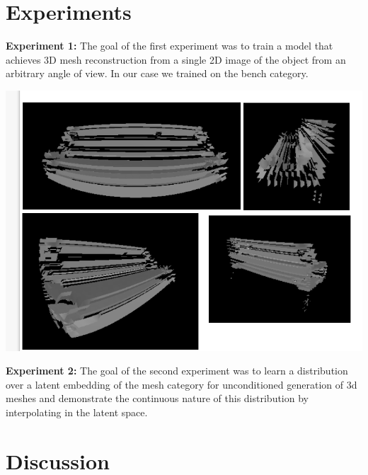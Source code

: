 \documentclass[11pt]{article}
\begin{document}
\section{Experiments}

\textbf{Experiment 1:} The goal of the first experiment was to train a model that achieves 3D mesh reconstruction from a single 2D image of the object from an arbitrary angle of view. In our case we trained on the bench category.

\includegraphics[scale=0.75]{./benchImages/benches.png}

\textbf{Experiment 2:} The goal of the second experiment was to learn a distribution over a latent embedding of the mesh category for unconditioned generation of 3d meshes and demonstrate the continuous nature of this distribution by interpolating in the latent space.

\section{Discussion}
\end{document}
